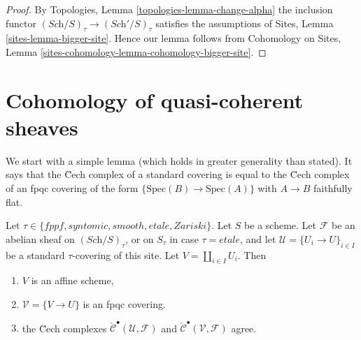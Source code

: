 \begin{proof}
By
Topologies, Lemma \ref{topologies-lemma-change-alpha}
the inclusion functor $(\textit{Sch}/S)_\tau \to (\textit{Sch}'/S)_\tau$
satisfies the assumptions of
Sites, Lemma \ref{sites-lemma-bigger-site}.
Hence our lemma follows from
Cohomology on Sites, Lemma \ref{sites-cohomology-lemma-cohomology-bigger-site}.
\end{proof}


\section{Cohomology of quasi-coherent sheaves}
\label{section-cohomology-quasi-coherent}

\noindent
We start with a simple lemma (which holds in greater generality than
stated). It says that the \u Cech complex of a standard covering is
equal to the \u Cech complex of an fpqc covering of the form
$\{\text{Spec}(B) \to \text{Spec}(A)\}$ with $A \to B$ faithfully flat.

\begin{lemma}
\label{lemma-cech-complex}
Let $\tau \in \{fppf, syntomic, smooth, etale, Zariski\}$.
Let $S$ be a scheme.
Let $\mathcal{F}$ be an abelian sheaf on $(\textit{Sch}/S)_\tau$, or on
$S_\tau$ in case $\tau = etale$, and let
$\mathcal{U} = \{U_i \to U\}_{i \in I}$
be a standard $\tau$-covering of this site.
Let $V = \coprod_{i \in I} U_i$. Then
\begin{enumerate}
\item $V$ is an affine scheme,
\item $\mathcal{V} = \{V \to U\}$ is an fpqc covering.
\item the \u Cech complexes
$\check{\mathcal{C}}^\bullet (\mathcal{U}, \mathcal{F})$ and
$\check{\mathcal{C}}^\bullet (\mathcal{V}, \mathcal{F})$ agree.
\end{enumerate}
\end{lemma}

